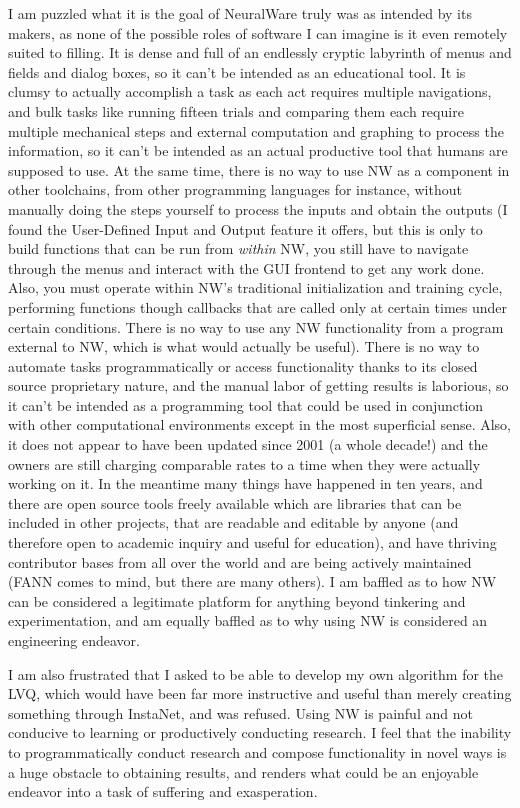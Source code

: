 \documentclass[12pt]{article}
\begin{document}
I am puzzled what it is the goal of NeuralWare truly was as intended by its makers, as none of the possible roles of software I can imagine is it even remotely suited to filling.  It is dense and full of an endlessly cryptic labyrinth of menus and fields and dialog boxes, so it can't be intended as an educational tool.  It is clumsy to actually accomplish a task as each act requires multiple navigations, and bulk tasks like running fifteen trials and comparing them each require multiple mechanical steps and external computation and graphing to process the information, so it can't be intended as an actual productive tool that humans are supposed to use.  At the same time, there is no way to use NW as a component in other toolchains, from other programming languages for instance, without manually doing the steps yourself to process the inputs and obtain the outputs (I found the User-Defined Input and Output feature it offers, but this is only to build functions that can be run from \emph{within} NW, you still have to navigate through the menus and interact with the GUI frontend to get any work done.  Also, you must operate within NW's traditional initialization and training cycle, performing functions though callbacks that are called only at certain times under certain conditions.  There is no way to use any NW functionality from a program external to NW, which is what would actually be useful).  There is no way to automate tasks programmatically or access functionality thanks to its closed source proprietary nature, and the manual labor of getting results is laborious, so it can't be intended as a programming tool that could be used in conjunction with other computational environments except in the most superficial sense.  Also, it does not appear to have been updated since 2001 (a whole decade!) and the owners are still charging comparable rates to a time when they were actually working on it.  In the meantime many things have happened in ten years, and there are open source tools freely available which are libraries that can be included in other projects, that are readable and editable by anyone (and therefore open to academic inquiry and useful for education), and have thriving contributor bases from all over the world and are being actively maintained (FANN comes to mind, but there are many others).  I am baffled as to how NW can be considered a legitimate platform for anything beyond tinkering and experimentation, and am equally baffled as to why using NW is considered an engineering endeavor.  

I am also frustrated that I asked to be able to develop my own algorithm for the LVQ, which would have been far more instructive and useful than merely creating something through InstaNet, and was refused.  Using NW is painful and not conducive to learning or productively conducting research.  I feel that the inability to programmatically conduct research and compose functionality in novel ways is a huge obstacle to obtaining results, and renders what could be an enjoyable endeavor into a task of suffering and exasperation.  
\end{document}
